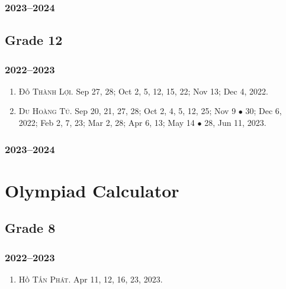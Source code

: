 \documentclass{article}
\begin{document}
\subsubsection{2023--2024}


\subsection{Grade 12}

\subsubsection{2022--2023}

\begin{enumerate}
	\item \textsc{Đỗ Thành Lợi.} {\sf[In]} Sep 27, 28; Oct 2, 5, 12, 15, 22; Nov 13; Dec 4, 2022. {\sf[Out]}
	\item \textsc{Du Hoàng Tú.} {\sf[In]} Sep 20, 21, 27, 28; Oct 2, 4, 5, 12, 25; Nov 9 $\bullet$ 30; Dec 6, 2022; Feb 2, 7, 23; Mar 2, 28; Apr 6, 13; May 14 $\bullet$ 28, Jun 11, 2023. {\sf[Out]}
\end{enumerate}

\subsubsection{2023--2024}


\section{Olympiad Calculator}

\subsection{Grade 8}

\subsubsection{2022--2023}

\begin{enumerate}
	\item \textsc{Hồ Tấn Phát.} {\sf[In]} Apr 11, 12, 16, 23, 2023.
\end{enumerate}
\end{document}

